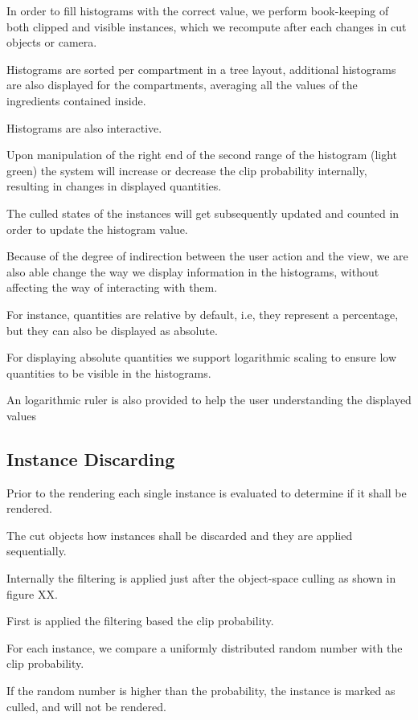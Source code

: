 In order to fill histograms with the correct value, we perform book-keeping of both clipped and visible instances, which we recompute after each changes in cut objects or camera.

Histograms are sorted per compartment in a tree layout, additional histograms are also displayed for the compartments, averaging all the values of the ingredients contained inside.

Histograms are also interactive.

Upon manipulation of the right end of the second range of the histogram (light green) the system will increase or decrease the clip probability internally, resulting in changes in displayed quantities.

The culled states of the instances will get subsequently updated and counted in order to update the histogram value.

Because of the degree of indirection between the user action and the view, we are also able change the way we display information in the histograms, without affecting the way of interacting with them.

For instance, quantities are relative by default, i.e, they represent a percentage, but they can also be displayed as absolute.

For displaying absolute quantities we support logarithmic scaling to ensure low quantities to be visible in the histograms.

An logarithmic ruler is also provided to help the user understanding the displayed values


\subsection{Instance Discarding}

Prior to the rendering each single instance is evaluated to determine if it shall be rendered.

The cut objects how instances shall be discarded and they are applied sequentially.

Internally the filtering is applied just after the object-space culling as shown in figure XX.

First is applied the filtering based the clip probability.

For each instance, we compare a uniformly distributed random number with the clip probability.

If the random number is higher than the probability, the instance is marked as culled, and will not be rendered. 

